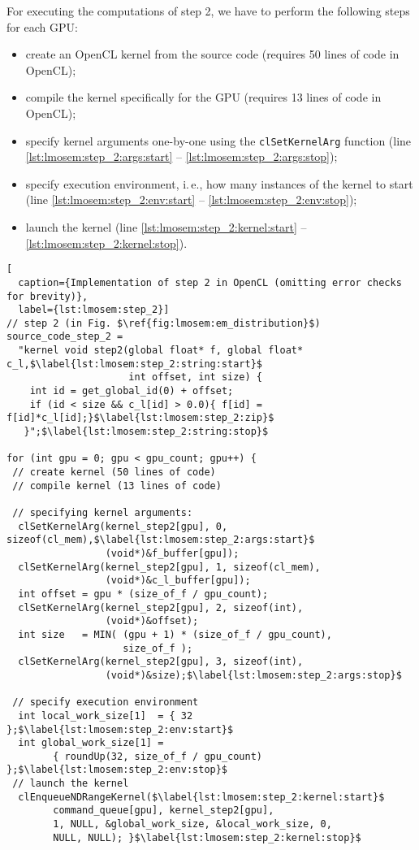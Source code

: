 For executing the computations of step 2, we have to perform the following steps for each GPU:
\begin{itemize}
  \item create an OpenCL kernel from the source code (requires 50 lines of code in OpenCL);
  \item compile the kernel specifically for the GPU (requires 13 lines of code in OpenCL);
  \item specify kernel arguments one-by-one using the \texttt{clSetKernelArg} function (line \ref{lst:lmosem:step_2:args:start} -- \ref{lst:lmosem:step_2:args:stop});
  \item specify execution environment, i.\,e., how many instances of the kernel to start (line \ref{lst:lmosem:step_2:env:start} -- \ref{lst:lmosem:step_2:env:stop});
  \item launch the kernel (line \ref{lst:lmosem:step_2:kernel:start} -- \ref{lst:lmosem:step_2:kernel:stop}).
\end{itemize}
\begin{lstlisting}[
  caption={Implementation of step 2 in OpenCL (omitting error checks for brevity)},
  label={lst:lmosem:step_2}]
// step 2 (in Fig. $\ref{fig:lmosem:em_distribution}$)
source_code_step_2 =
  "kernel void step2(global float* f, global float* c_l,$\label{lst:lmosem:step_2:string:start}$
                     int offset, int size) {
    int id = get_global_id(0) + offset;
    if (id < size && c_l[id] > 0.0){ f[id] = f[id]*c_l[id];}$\label{lst:lmosem:step_2:zip}$
   }";$\label{lst:lmosem:step_2:string:stop}$

for (int gpu = 0; gpu < gpu_count; gpu++) {
 // create kernel (50 lines of code)
 // compile kernel (13 lines of code)

 // specifying kernel arguments:
  clSetKernelArg(kernel_step2[gpu], 0, sizeof(cl_mem),$\label{lst:lmosem:step_2:args:start}$
                 (void*)&f_buffer[gpu]);
  clSetKernelArg(kernel_step2[gpu], 1, sizeof(cl_mem),
                 (void*)&c_l_buffer[gpu]);
  int offset = gpu * (size_of_f / gpu_count);
  clSetKernelArg(kernel_step2[gpu], 2, sizeof(int),
                 (void*)&offset);
  int size   = MIN( (gpu + 1) * (size_of_f / gpu_count),
                    size_of_f );
  clSetKernelArg(kernel_step2[gpu], 3, sizeof(int),
                 (void*)&size);$\label{lst:lmosem:step_2:args:stop}$

 // specify execution environment
  int local_work_size[1]  = { 32 };$\label{lst:lmosem:step_2:env:start}$
  int global_work_size[1] =
        { roundUp(32, size_of_f / gpu_count) };$\label{lst:lmosem:step_2:env:stop}$
 // launch the kernel
  clEnqueueNDRangeKernel($\label{lst:lmosem:step_2:kernel:start}$
        command_queue[gpu], kernel_step2[gpu],
        1, NULL, &global_work_size, &local_work_size, 0,
        NULL, NULL); }$\label{lst:lmosem:step_2:kernel:stop}$
\end{lstlisting}


